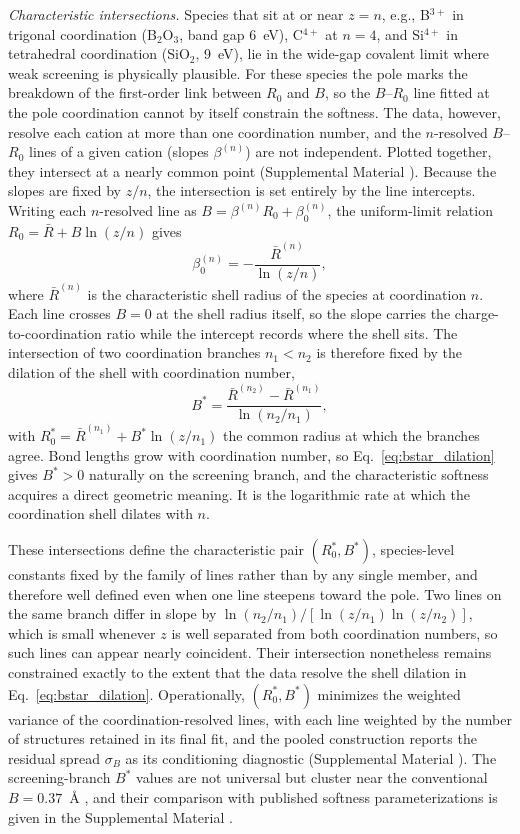 \documentclass[aps,prmaterials,twocolumn,10pt,superscriptaddress,floatfix]{revtex4-2}
\newcommand{\runinsec}[1]{\medskip\emph{#1}}
\begin{document}
\runinsec{Characteristic intersections.} Species that sit at or near
$z=n$, e.g., B$^{3+}$ in trigonal coordination (B$_2$O$_3$, band gap
6~eV), C$^{4+}$ at $n=4$, and Si$^{4+}$ in tetrahedral coordination
(SiO$_2$, 9~eV), lie in the wide-gap covalent limit where weak
screening is physically plausible.  For these species the pole marks
the breakdown of the first-order link between $R_0$ and $B$, so the
$B$--$R_0$ line fitted at the pole coordination cannot by itself
constrain the softness.  The data, however, resolve each cation at
more than one coordination number, and the $n$-resolved $B$--$R_0$
lines of a given cation (slopes $\beta^{(n)}$) are not independent.
Plotted together, they intersect at a nearly common point
(Supplemental Material \cite{suppmat}).  Because the slopes are fixed
by $z/n$, the intersection is set entirely by the line intercepts.
Writing each $n$-resolved line as $B=\beta^{(n)}R_0+\beta_0^{(n)}$,
\cite{Li2025} the uniform-limit relation $R_0=\bar R+B\ln(z/n)$ gives
\begin{equation}\label{eq:intercept}
\beta_0^{(n)}=-\frac{\bar R^{(n)}}{\ln(z/n)},
\end{equation}
where $\bar R^{(n)}$ is the characteristic shell radius of the
species at coordination $n$.  Each line crosses $B=0$ at the shell
radius itself, so the slope carries the charge-to-coordination ratio
while the intercept records where the shell sits.  The intersection
of two coordination branches $n_1<n_2$ is therefore fixed by the
dilation of the shell with coordination number,
\begin{equation}\label{eq:bstar_dilation}
B^*=\frac{\bar R^{(n_2)}-\bar R^{(n_1)}}{\ln(n_2/n_1)},
\end{equation}
with $R_0^*=\bar R^{(n_1)}+B^*\ln(z/n_1)$ the common radius at which
the branches agree.  Bond lengths grow with coordination number, so
Eq.~\eqref{eq:bstar_dilation} gives $B^*>0$ naturally on the
screening branch, and the characteristic softness acquires a direct
geometric meaning.  It is the logarithmic rate at which the
coordination shell dilates with $n$.

These intersections define the characteristic pair $(R_0^*,B^*)$,
species-level constants fixed by the family of lines rather than by
any single member, and therefore well defined even when one line
steepens toward the pole.  Two lines on the same branch differ in
slope by $\ln(n_2/n_1)/[\ln(z/n_1)\ln(z/n_2)]$, which is small
whenever $z$ is well separated from both coordination numbers, so
such lines can appear nearly coincident.  Their intersection
nonetheless remains constrained exactly to the extent that the data
resolve the shell dilation in Eq.~\eqref{eq:bstar_dilation}.
Operationally, $(R_0^*,B^*)$ minimizes the weighted variance of the
coordination-resolved lines, with each line weighted by the number
of structures retained in its final fit, and the pooled construction
reports the residual spread $\sigma_B$ as its conditioning
diagnostic (Supplemental Material \cite{suppmat}).  The
screening-branch $B^*$ values are not universal but cluster near the
conventional $B=0.37$~\AA{} \cite{Brown1985}, and their comparison
with published softness parameterizations
\cite{Adams2001,Chen2017,Gagn2015} is given in the Supplemental
Material \cite{suppmat}.
\end{document}
